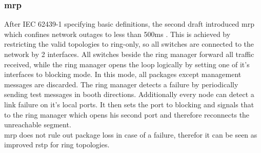 \subsubsection{\gls{mrp}}
After IEC 62439-1 specifying basic definitions, the second draft introduced \gls{mrp} which confines network outages to less than 500ms \cite{6145654}.
This is achieved by restricting the valid topologies to ring-only, so all switches are connected to the network by 2 interfaces. All switches beside the ring manager
forward all traffic received, while the ring manager opens the loop logically by setting one of it's interfaces to blocking mode. In this mode,
all packages except management messages are discarded. The ring manager detects a failure by periodically sending test messages in booth
directions. Additionally every node can detect a link failure on it's local ports. It then sets the port to blocking and signals that to the
ring manager which opens his second port and therefore reconnects the unreachable segment.
\\
\gls{mrp} does not rule out package loss in case of a failure, therefor it can be seen as improved \gls{rstp} for ring topologies. 

